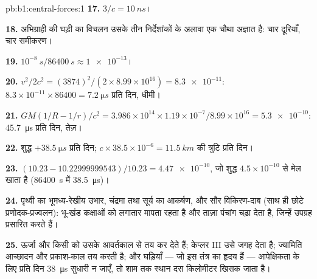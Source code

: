 \begin{solution}{pb:b1:central-forces:1}
\textbf{17.} $3/c = \qty{10}{ns}$।

\textbf{18.} अभिग्राही की घड़ी का विचलन उसके तीन निर्देशांकों के अलावा एक
चौथा अज्ञात है: चार दूरियाँ, चार समीकरण।

\textbf{19.} $10^{-8}\ \unit{s}/\qty{86400}{s} \approx \num{1e-13}$।

\textbf{20.} $v^2/2c^2 = (3874)^2/(2 \times 8.99\times10^{16}) = \num{8.3e-11}$:
$8.3\times10^{-11} \times 86400 = \qty{7.2}{\micro s}$ प्रति दिन, धीमी।

\textbf{21.} $GM(1/R - 1/r)/c^2 = 3.986\times10^{14} \times 1.19\times10^{-7}/
8.99\times10^{16} = \num{5.3e-10}$: \qty{45.7}{\micro s} प्रति दिन, तेज़।

\textbf{22.} शुद्ध $+\qty{38.5}{\micro s}$ प्रति दिन; $c \times 38.5\times10^{-6}
= \qty{11.5}{km}$ की त्रुटि प्रति दिन।

\textbf{23.} $(10.23 - 10.22999999543)/10.23 = \num{4.47e-10}$, जो शुद्ध
$4.5\times10^{-10}$ से मेल खाता है (\qty{86400}{s} में \qty{38.5}{\micro s})।

\textbf{24.} पृथ्वी का भूमध्य-रेखीय उभार, चंद्रमा तथा सूर्य का आकर्षण, और
सौर विकिरण-दाब (साथ ही छोटे प्रणोदक-प्रज्वलन): भू-खंड कक्षाओं को लगातार
मापता रहता है और ताज़ा पंचांग चढ़ा देता है, जिन्हें उपग्रह प्रसारित करते
हैं।

\textbf{25.} ऊर्जा और  किसी  को उसके आवर्तकाल से
तय कर देते हैं; केप्लर III उसे जगह देता है; ज्यामिति आच्छादन और प्रकाश-काल
तय करती है; और घड़ियाँ --- जो इस तंत्र का हृदय हैं --- आपेक्षिकता के लिए
प्रति दिन \qty{38}{\micro s} सुधारी न जाएँ, तो शाम तक स्थान दस किलोमीटर
खिसक जाता है।
\end{solution}
